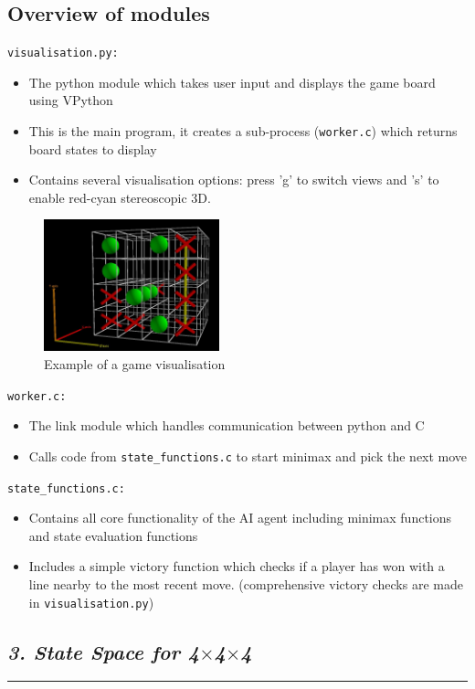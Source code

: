 \documentclass[10pt,twocolumn]{article}
\begin{document}
\subsection*{Overview of modules}
\texttt{visualisation.py:}
\begin{itemize}
\item The python module which takes user input and displays the game board using VPython
\item This is the main program, it creates a sub-process (\texttt{worker.c}) which returns
board states to display
\item Contains several visualisation options: press 'g' to switch views and 's' to enable
red-cyan stereoscopic 3D.
\end{itemize}
\begin{figure}[h]
  \begin{center}
    \includegraphics[width=2in]{vis.jpg}
  \end{center}
  \caption{Example of a game visualisation}
  \label{fig:vis}
\end{figure}
\texttt{worker.c:}
\begin{itemize}
\item The link module which handles communication between python and C
\item Calls code from \texttt{state\_functions.c} to start minimax and pick the next move
\end{itemize}
\texttt{state\_functions.c:}
\begin{itemize}
\item Contains all core functionality of the AI agent including minimax functions and state
evaluation functions
\item Includes a simple victory function which checks if a player has won with a line nearby to
the most recent move. (comprehensive victory checks are made in \texttt{visualisation.py})
\end{itemize}

\subsection*{\emph { \textmd{3. State Space for 4$\times$4$\times$4}}}
\hrule
\vspace{0.4cm}
\end{document}
